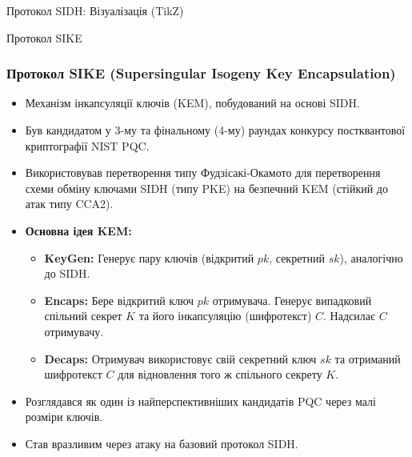 \documentclass[9pt]{beamer}
\begin{document}
\begin{darkframes}
\begin{frame}{Протокол SIDH: Візуалізація (TikZ)}
  
\end{frame}


\begin{frame}{Протокол SIKE}
  \frametitle{Протокол SIKE (Supersingular Isogeny Key Encapsulation)}
  \begin{itemize}
    \item Механізм інкапсуляції ключів (KEM), побудований на основі SIDH.
    \item Був кандидатом у 3-му та фінальному (4-му) раундах конкурсу постквантової криптографії NIST PQC.
    \item Використовував перетворення типу Фудзісакі-Окамото для перетворення схеми обміну ключами SIDH (типу PKE) на безпечний KEM (стійкий до атак типу CCA2).
    \item \textbf{Основна ідея KEM:}
      \begin{itemize}
        \item \textbf{KeyGen:} Генерує пару ключів (відкритий $pk$, секретний $sk$), аналогічно до SIDH.
        \item \textbf{Encaps:} Бере відкритий ключ $pk$ отримувача. Генерує випадковий спільний секрет $K$ та його інкапсуляцію (шифротекст) $C$. Надсилає $C$ отримувачу.
        \item \textbf{Decaps:} Отримувач використовує свій секретний ключ $sk$ та отриманий шифротекст $C$ для відновлення того ж спільного секрету $K$.
      \end{itemize}
    \item Розглядався як один із найперспективніших кандидатів PQC через малі розміри ключів.
    \item Став вразливим через атаку на базовий протокол SIDH.
  \end{itemize}
\end{frame}



\end{darkframes}
\end{document}
